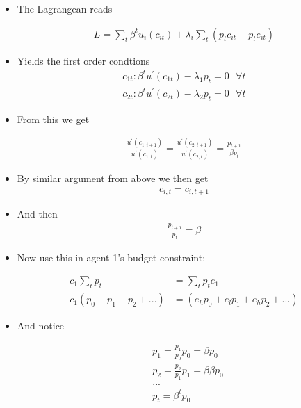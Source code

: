 \documentclass{scrartcl}
\begin{document}
\begin{itemize}
	\item The Lagrangean reads
	
		\begin{align}
	L=\sum_{t} \beta^t u_{i} (c_{it})+ \lambda_{i} \sum_t \left( p_t c_{it}-p_t e_{it}\right)
	\end{align}
	
	\item Yields the first order condtions
	\begin{align}
	c_{1t}: \beta^t u^{\prime}(c_{1t})-\lambda_1 p_t=0  \text{ } \forall t\\
	c_{2t}: \beta^t u^{\prime}(c_{2t})-\lambda_2 p_t=0 \text{ } \forall t
	\end{align}
	
	\item From this we get
	
	\begin{align}
	\frac{u^{\prime}(c_{1,t+1})}{u^{\prime}(c_{1,t})}=\frac{u^{\prime}(c_{2,t+1})}{u^{\prime}(c_{2,t})}=\frac{p_{t+1}}{\beta p_{t}}
	\end{align}
	
	\item By similar argument from above we then get
	\begin{align}
	c_{i,t}=c_{i,t+1}
	\end{align}
	\item And then
	\begin{align}
	\frac{p_{t+1}}{p_{t}}=\beta
	\end{align}
	
	\item Now use this in agent 1's budget constraint:
	
	\begin{align}
	c_1 \sum_t p_t &= \sum_t p_t e_{1}  \\
	c_1 \left( p_0+ p_1 + p_2 + ... \right) &= \left( e_h p_0+ e_l p_1 + e_h p_2 + ... \right)
	\end{align}
	
	\item And notice

	\begin{align}
	&p_1 = \frac{p_1}{p_0} p_0 = \beta p_0 \\
	&p_2 = \frac{p_2}{p_1} p_1 = \beta \beta p_0 \\
	&... \\
	&p_t =  \beta^t p_0
	\end{align}
	

\end{itemize}
\end{document}
